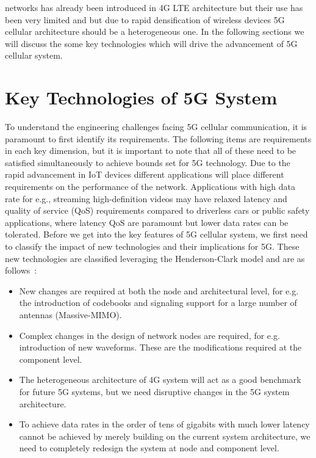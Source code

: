 networks has already been introduced in 4G LTE architecture but their use has been very limited and but due to rapid densification  of wireless devices 5G cellular architecture should be a heterogeneous one. In the following sections we will discuss the some key technologies which will drive the advancement of 5G cellular system.

\section{Key Technologies of 5G System}

To understand the engineering challenges facing 5G cellular communication, it is paramount to first identify its requirements. The following items are requirements in each key dimension, but it is important to note that all of these need to be satisfied simultaneously to achieve bounds set for 5G technology. Due to the rapid advancement in IoT devices different applications will place different requirements on the performance of the network. Applications with high data rate for e.g., streaming high-definition videos may have relaxed latency and quality of service (QoS) requirements compared to driverless cars or public safety applications, where latency QoS are paramount but lower data rates can be tolerated. Before we get into the key features of 5G cellular system, we first need to classify the impact of new technologies and their implications for 5G. These new technologies are classified leveraging the Henderson-Clark model and are as follows~\cite{Boccardi20140}:
\begin{itemize}
\item New changes are required at both the node and architectural level, for e.g. the introduction of codebooks and signaling support for a large number of antennas (Massive-MIMO).

\item Complex changes in the design of network nodes are required, for e.g. introduction of new waveforms. These are the modifications required at the component level.

\item The heterogeneous architecture of 4G system will act as a good benchmark for future 5G systems, but we need disruptive changes in the 5G system architecture. 

\item To achieve data rates in the order of tens of gigabits with much lower latency cannot be achieved by merely building on the current system architecture, we need to completely redesign the system at node and component level. 
\end{itemize}

